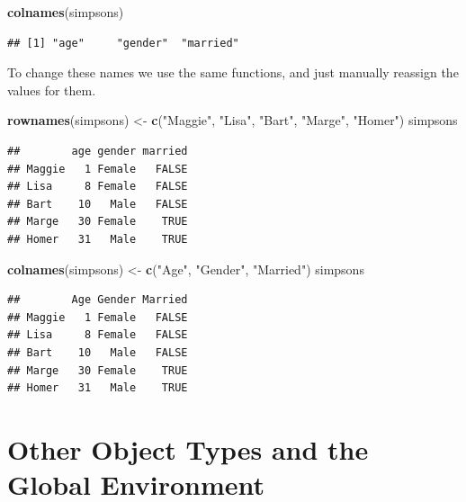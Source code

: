 \documentclass[
]{book}
\newenvironment{Shaded}{\begin{snugshade}}{\end{snugshade}}
\newcommand{\KeywordTok}[1]{\textcolor[rgb]{0.13,0.29,0.53}{\textbf{#1}}}
\newcommand{\NormalTok}[1]{#1}
\newcommand{\StringTok}[1]{\textcolor[rgb]{0.31,0.60,0.02}{#1}}
\begin{document}
\begin{Shaded}
\begin{Highlighting}[]
\KeywordTok{colnames}\NormalTok{(simpsons)}
\end{Highlighting}
\end{Shaded}

\begin{verbatim}
## [1] "age"     "gender"  "married"
\end{verbatim}

To change these names we use the same functions, and just manually reassign the values for them.

\begin{Shaded}
\begin{Highlighting}[]
\KeywordTok{rownames}\NormalTok{(simpsons) <-}\StringTok{ }\KeywordTok{c}\NormalTok{(}\StringTok{"Maggie"}\NormalTok{,}
    \StringTok{"Lisa"}\NormalTok{, }\StringTok{"Bart"}\NormalTok{, }\StringTok{"Marge"}\NormalTok{,}
    \StringTok{"Homer"}\NormalTok{)}
\NormalTok{simpsons}
\end{Highlighting}
\end{Shaded}

\begin{verbatim}
##        age gender married
## Maggie   1 Female   FALSE
## Lisa     8 Female   FALSE
## Bart    10   Male   FALSE
## Marge   30 Female    TRUE
## Homer   31   Male    TRUE
\end{verbatim}

\begin{Shaded}
\begin{Highlighting}[]
\KeywordTok{colnames}\NormalTok{(simpsons) <-}\StringTok{ }\KeywordTok{c}\NormalTok{(}\StringTok{"Age"}\NormalTok{,}
    \StringTok{"Gender"}\NormalTok{, }\StringTok{"Married"}\NormalTok{)}
\NormalTok{simpsons}
\end{Highlighting}
\end{Shaded}

\begin{verbatim}
##        Age Gender Married
## Maggie   1 Female   FALSE
## Lisa     8 Female   FALSE
## Bart    10   Male   FALSE
## Marge   30 Female    TRUE
## Homer   31   Male    TRUE
\end{verbatim}

\hypertarget{other-object-types-and-the-global-environment}{%
\section{Other Object Types and the Global Environment}\label{other-object-types-and-the-global-environment}}
\end{document}
